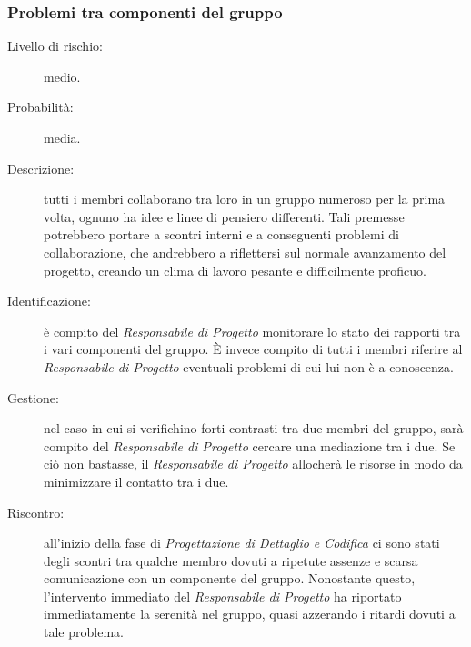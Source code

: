 \subsubsection{Problemi tra componenti del gruppo}
\label{rischi}
\begin{description}
	\item[Livello di rischio:] medio.
	\item[Probabilità:] media.
	\item[Descrizione:] tutti i membri collaborano tra loro in un gruppo numeroso per la prima volta, ognuno ha idee e linee di pensiero differenti.
	Tali premesse potrebbero portare a scontri interni e a conseguenti problemi di collaborazione, che andrebbero a riflettersi sul normale	avanzamento del progetto, creando un clima di lavoro pesante e difficilmente proficuo.
	\item[Identificazione:] è compito del \textit{Responsabile di Progetto} monitorare lo stato dei rapporti tra i vari componenti del gruppo. È invece compito di tutti i membri riferire al \textit{Responsabile di Progetto} eventuali problemi di cui lui non è a conoscenza.
	\item[Gestione:] nel caso in cui si verifichino forti contrasti tra due membri del gruppo, sarà compito del \textit{Responsabile di Progetto} cercare una mediazione tra i due. Se ciò non bastasse, il \textit{Responsabile di Progetto} allocherà le risorse in modo da minimizzare il contatto tra i due.
	\item[Riscontro:] all'inizio della fase di \textit{Progettazione di Dettaglio e Codifica} ci sono stati degli scontri tra qualche membro dovuti a ripetute assenze e scarsa comunicazione con un componente del gruppo. Nonostante questo, l'intervento immediato del \textit{Responsabile di Progetto} ha riportato immediatamente la serenità nel gruppo, quasi azzerando i ritardi dovuti a tale problema. 
\end{description}
